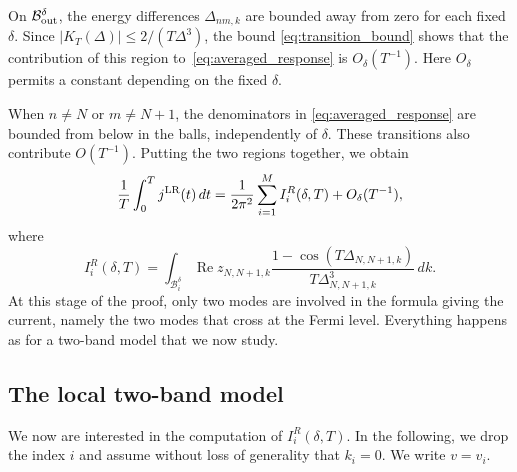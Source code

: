 \documentclass[a4paper,11pt]{article}
\theoremstyle{plain}
\theoremstyle{remark}
\begin{document}
On $\mathcal B_{\rm out}^\delta$, the energy differences
$\Delta_{nm,k}$ are bounded away from zero for each fixed $\delta$.
Since $|K_T(\Delta)|\le2/(T\Delta^3)$, the bound
\eqref{eq:transition_bound} shows that the contribution of this region
to~\eqref{eq:averaged_response} is $O_\delta(T^{-1})$.
Here $O_\delta$ permits a constant depending on the fixed $\delta$.

When $n\ne N$ or $m\ne N+1$, the denominators in
\eqref{eq:averaged_response} are bounded from below in the balls,
independently of $\delta$. These transitions also contribute
$O(T^{-1})$. Putting the two regions together, we obtain
\begin{equation}\label{eq:two_band_average}
\frac1T\int_0^Tj^{\rm LR}(t)\,dt
=\frac1{2\pi^2}\sum_{i=1}^M I_i^R(\delta,T)+O_\delta(T^{-1}),
\end{equation}
where
\begin{equation}\label{eq:IRdt}
I_i^R(\delta,T)=\int_{\mathcal B_i^\delta}
\operatorname{Re}z_{N,N+1,k}
\frac{1-\cos(T\Delta_{N,N+1,k})}{T\Delta_{N,N+1,k}^3}\,dk.
\end{equation}
At this stage of the proof, only two modes are involved in the formula
giving the current, namely the two modes that cross at the Fermi level.
Everything happens as for a two-band model that we now study.


\subsection{The local two-band model}
We now are interested in the computation of $I_i^R(\delta,T)$.
In the following, we drop the index $i$ and assume without loss of
generality that $k_i=0$. We write $v=v_i$.
\end{document}
